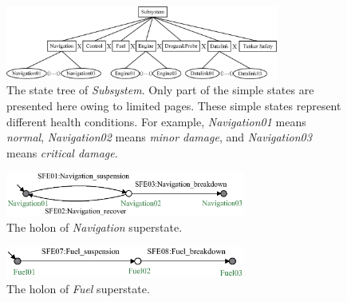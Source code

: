 \begin{figure}[h]
	\begin{center}
		\includegraphics[width=0.8\textwidth]{Figures/Figs_Ch14/Fig16_SSubsystem}
		\par\end{center}
	\caption{The state tree of \textit{Subsystem}. Only part of the simple states are presented here owing to limited pages. These simple states represent different health conditions. For example, \textit{Navigation01} means \textit{normal}, \textit{Navigation02} means \textit{minor damage}, and \textit{Navigation03} means \textit{critical damage}.}
	\label{fig:stsubsystem} 
\end{figure}
\begin{figure}[h]
	\begin{center}
		\includegraphics[width=0.7\textwidth]{Figures/Figs_Ch14/Fig17a_HNavigation}
		\par\end{center}
	\caption{The holon of \textit{Navigation} superstate.}
	\label{fig:plantnavi} 
\end{figure}	
\begin{figure}[h]
	\begin{center}
		\includegraphics[width=0.7\textwidth]{Figures/Figs_Ch14/Fig17b_HFuel}
		\par\end{center}
	\caption{The holon of \textit{Fuel} superstate.}
	\label{fig:plantfuel} 
\end{figure}


